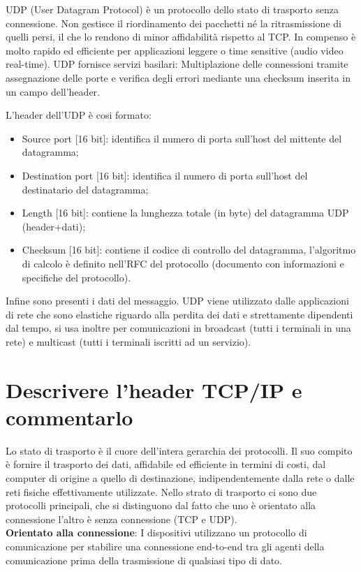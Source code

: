 UDP (User Datagram Protocol) è un protocollo dello stato di trasporto senza connessione. Non gestisce il riordinamento dei pacchetti né la ritrasmissione di quelli persi, il che lo rendono di minor affidabilità rispetto al TCP. In compenso è molto rapido ed efficiente per applicazioni leggere o time sensitive (audio video real-time).
UDP fornisce servizi basilari: Multiplazione delle connessioni tramite assegnazione delle porte e verifica degli errori mediante una checksum inserita in un campo dell’header.

L’header dell’UDP è cosi formato:
\begin{itemize}
\item	Source port [16 bit]: identifica il numero di porta sull’host del mittente del datagramma;
\item	Destination port [16 bit]: identifica il numero di porta sull’host del destinatario del datagramma;
\item	Length [16 bit]: contiene la lunghezza totale (in byte) del datagramma UDP (header+dati);
\item	Checksum [16 bit]: contiene il codice di controllo del datagramma, l’algoritmo di calcolo è definito nell’RFC del protocollo (documento con informazioni e specifiche del protocollo).
\end{itemize}
Infine sono presenti i dati del messaggio.
UDP viene utilizzato dalle applicazioni di rete che sono elastiche riguardo alla perdita dei dati e strettamente dipendenti dal tempo, si usa inoltre per comunicazioni in broadcast (tutti i terminali in una rete) e multicast (tutti i terminali iscritti ad un servizio).
 
\section{Descrivere l’header TCP/IP e commentarlo}
Lo stato di trasporto è il cuore dell’intera gerarchia dei protocolli. Il suo compito è fornire il trasporto dei dati, affidabile ed efficiente in termini di costi, dal computer di origine a quello di destinazione, indipendentemente dalla rete o dalle reti fisiche effettivamente utilizzate.
Nello strato di trasporto ci sono due protocolli principali, che si distinguono dal fatto che uno è orientato alla connessione l’altro è senza connessione (TCP e UDP).\\
\textbf{Orientato alla connessione}: I dispositivi utilizzano un protocollo di comunicazione per stabilire una connessione end-to-end tra gli agenti della comunicazione prima della trasmissione di qualsiasi tipo di dato.

